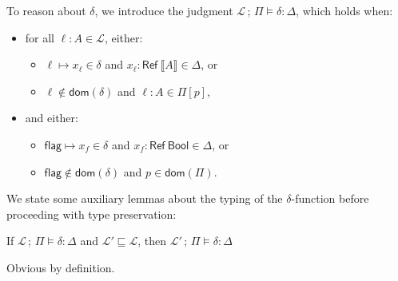 \documentclass{article}
\newcommand{\mf}[1]{\mathsf{#1}}
\newcommand{\mc}[1]{\mathcal{#1}}
\newcommand{\semi}{\,;\,}
\newcommand{\dom}{\mf{dom}}
\newcommand{\po}{\sqsubseteq}
\newcommand{\llrr}[1]{\llbracket #1 \rrbracket}
\newcommand{\tbool}{\mf{Bool}}
\newcommand{\tref}[1]{\mf{Ref}\ #1}
\newcommand{\Ell}{\mc{L}}
\begin{document}
To reason about $\delta$, we introduce the judgment
$\Ell \semi \Pi \vDash \delta: \Delta$,
which holds when:
\begin{itemize}
\item for all $\ell: A \in \Ell$, either:
\begin{itemize}
  \item $\ell \mapsto x_\ell \in \delta$ 
  and $x_\ell: \tref{\llrr{A}} \in \Delta$, or
  \item $\ell \notin \dom(\delta)$ and $\ell: A \in \Pi[p]$,
\end{itemize}
\item and either:
\begin{itemize}
  \item $\mf{flag} \mapsto x_f \in \delta$ 
  and $x_f: \tref{\tbool} \in \Delta$, or
  \item $\mf{flag} \notin \dom(\delta)$ and $p \in \dom(\Pi)$.
\end{itemize}
\end{itemize}

We state some auxiliary lemmas about 
the typing of the $\delta$-function
before proceeding with type preservation:
\begin{lemma}
\label{thm:deltasub}

If $\Ell \semi \Pi \vDash \delta: \Delta$
and $\Ell' \po \Ell$,
then $\Ell' \semi \Pi \vDash \delta: \Delta$

\begin{Proof}
Obvious by definition.
\end{Proof}
\end{lemma}
\end{document}
